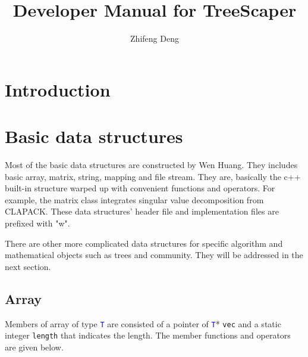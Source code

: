 \documentclass[11pt,a4paper]{article}
\title{Developer Manual for TreeScaper}
\author{Zhifeng Deng}
\newcommand{\ttype}[1]{\textcolor{blue}{\texttt{#1}}}
\theoremstyle{definition}
\theoremstyle{definition}
\numberwithin{equation}{section}
\begin{document}
	\maketitle

	\tableofcontents
	
	
	\section{Introduction}
	
	\section{Basic data structures}
	
	Most of the basic data structures are constructed by Wen Huang. They includes basic array, matrix, string, mapping and file stream. They are, basically the c++ built-in structure warped up with convenient functions and operators. For example, the matrix class integrates singular value decomposition from CLAPACK. These data structures' header file and implementation files are prefixed with "w".
	
	There are other more complicated data structures for specific algorithm and mathematical objects such as trees and community. They will be addressed in the next section. 
	
	\subsection{Array}
	
	Members of array of type \ttype{T} are consisted of a pointer of \ttype{T}* \texttt{vec} and a static integer \texttt{length} that indicates the length. The member functions and operators are given below.
	
\end{document}
